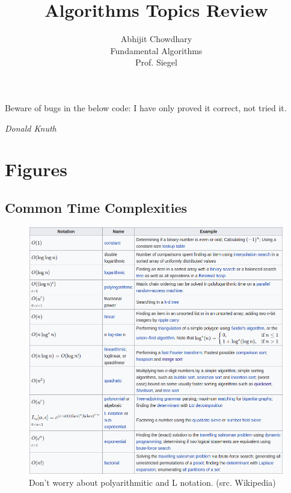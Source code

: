 \documentclass[12pt]{article}
\theoremstyle{definition}
\begin{document}
 

 
\title{Algorithms Topics Review}%
\author{Abhijit Chowdhary\\ %
Fundamental Algorithms \\
Prof. Siegel} %

\maketitle

\epigraph{Beware of bugs in the below code: I have only proved it correct, not
tried it.}{\textit{Donald Knuth}}

\tableofcontents
\pagebreak





\section{Figures}

\subsection{Common Time Complexities}
\begin{figure}[H]
\includegraphics[width= \textwidth]{./Images/classes.png}
\caption{Don't worry about polyarithmitic and L notation. (src. Wikipedia)}
\centering
\end{figure}
\end{document}
